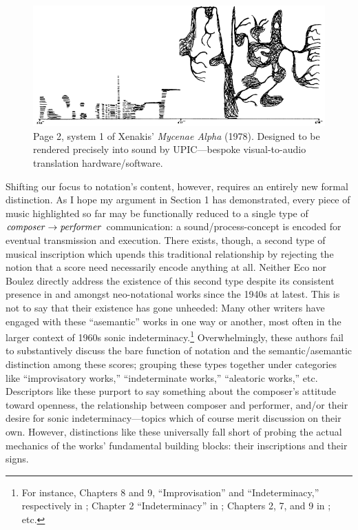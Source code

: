             \begin{figure} 
                \centering
                \includegraphics[width=.9\textwidth]{images/chapter2/mycenae.png}
                \captionsetup{width=.5\textwidth}
                \caption[Page 2, system 1 of Xenakis' \textit{Mycenae Alpha} (1978). Designed to be rendered precisely into sound by UPIC---bespoke visual-to-audio translation hardware/software.]{Page 2, system 1 of Xenakis' \textit{Mycenae Alpha} (1978). Designed to be rendered precisely into sound by UPIC---bespoke visual-to-audio translation hardware/software.\footnotemark}
                \label{fig:mycenae}
            \end{figure}
    
    Shifting our focus to notation's content, however, requires an entirely new formal distinction. As I hope my argument in Section 1 has demonstrated, every piece of music highlighted so far may be functionally reduced to a single type of $\text{\textit{composer}} \rightarrow \text{\textit{performer}}$ communication: a sound/process-concept is encoded for eventual transmission and execution. There exists, though, a second type of musical inscription which upends this traditional relationship by rejecting the notion that a score need necessarily encode anything at all. Neither Eco nor Boulez directly address the existence of this second type despite its consistent presence in and amongst neo-notational works since the 1940s at latest. This is not to say that their existence has gone unheeded: Many other writers have engaged with these ``asemantic'' works in one way or another, most often in the larger context of 1960s sonic indeterminacy.\footnote{For instance, Chapters 8 and 9, ``Improvisation'' and ``Indeterminacy,'' respectively in \cite{Cope_1984}; Chapter 2 ``Indeterminacy'' in \cite{Taruskin_2009d}; Chapters 2, 7, and 9 in \cite{Griffiths_2011}; etc.} Overwhelmingly, these authors fail to substantively discuss the bare function of notation and the semantic/asemantic distinction among these scores; grouping these types together under categories like ``improvisatory works,'' ``indeterminate works,'' ``aleatoric works,'' etc. Descriptors like these purport to say something about the composer's attitude toward openness, the relationship between composer and performer, and/or their desire for sonic indeterminacy---topics which of course merit discussion on their own. However, distinctions like these universally fall short of probing the actual mechanics of the works' fundamental building blocks: their inscriptions and their signs.


